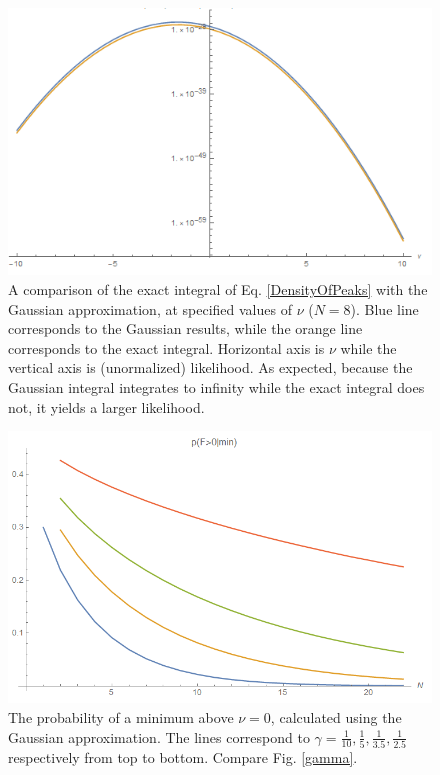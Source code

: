 \documentclass[12pt]{article}
\begin{document}
\begin{figure} 
  \centering
  \includegraphics[width=\linewidth]{Comparison.png}
  \caption{A comparison of the exact integral of Eq. \ref{DensityOfPeaks} with the Gaussian approximation, at specified values of $\nu$ ($N=8$). Blue line corresponds to the Gaussian results, while the orange line corresponds to the exact integral. Horizontal axis is $\nu$ while the vertical axis is (unormalized) likelihood. As expected, because the Gaussian integral integrates to infinity while the exact integral does not, it yields a larger likelihood.}
  \label{Comparison}
\end{figure}

\begin{figure} 
  \centering
  \includegraphics[width=\linewidth]{PVaryingWithNGaussian.png}
  \caption{The probability of a minimum above $\nu=0$, calculated using the Gaussian approximation. The lines correspond to $\gamma = \frac{1}{10}, \frac{1}{5}, \frac{1}{3.5}, \frac{1}{2.5}$ respectively from top to bottom. Compare Fig. \ref{gamma}.}
  \label{PVaryingWithNGaussian}
\end{figure}
\end{document}
